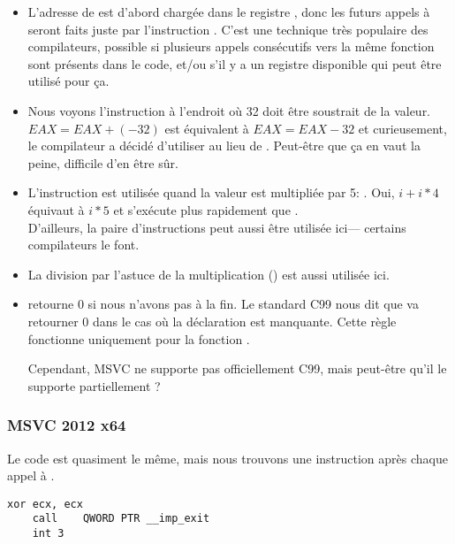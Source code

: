 \begin{itemize}
\item L'adresse de \printf est d'abord chargée dans le
registre \ESI, donc les futurs
appels à \printf seront faits juste par l'instruction .
C'est une technique très populaire
des compilateurs, possible si plusieurs appels consécutifs vers la même fonction sont présents
dans le code, et/ou s'il y a un registre disponible qui peut être utilisé pour ça.

\item Nous voyons l'instruction  
à l'endroit où 32 doit être soustrait de la valeur.
$EAX=EAX+(-32)$ est équivalent à $EAX=EAX-32$ 
et curieusement, le compilateur a décidé d'utiliser  au lieu de .
Peut-être que ça en vaut la peine, difficile d'en être sûr.

\item L'instruction \LEA est utilisée quand 
la valeur est multipliée par 5: .
Oui, $i+i*4$ équivaut à $i*5$ et \LEA 
s'exécute plus rapidement que .\\
D'ailleurs, la paire d'instructions  peut aussi être utilisée ici---
certains compilateurs le font.

\item La division par l'astuce de la multiplication () 
est aussi utilisée ici.

\item \main retourne 0 si nous n'avons pas  
à la fin.
Le standard C99 nous dit  que \main 
va retourner 0 dans le cas où 
la déclaration  est manquante.
Cette règle fonctionne uniquement pour la fonction \main.

Cependant, MSVC ne supporte pas officiellement C99, mais peut-être qu'il le supporte partiellement ?
\end{itemize}

\subsubsection{MSVC 2012 x64 \Optimizing}

Le code est quasiment le même, mais nous trouvons une instruction  après chaque appel à .

\begin{lstlisting}[style=customasmx86]
	xor	ecx, ecx
	call	QWORD PTR __imp_exit
	int	3
\end{lstlisting}

